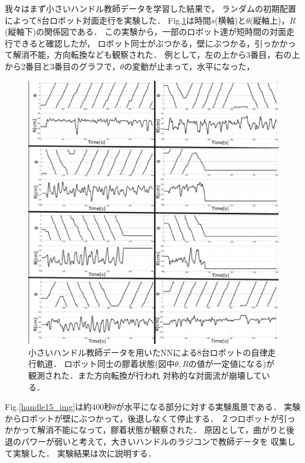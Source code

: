 我々はまず小さいハンドル教師データを学習した結果で，
ランダムの初期配置によって8台ロボット対面走行を実験した．
Fig.\ref{handle15_dia}は時間$s$(横軸)と$\theta$(縦軸上)，$R$(縦軸下)の関係図である．
この実験から，一部のロボット達が短時間の対面走行できると確認したが，
ロボット同士がぶつかる，壁にぶつかる，引っかかって解消不能，方向転換なども観察された．
例として，左の上から3番目，右の上から2番目と3番目のグラフで，$\theta$の変動が止まって，水平になった，

\vspace{-1mm}
\begin{figure}[!ht]
    \centering
    \includegraphics[width=1.0\linewidth]{NN_handle15.eps}
    \caption{小さいハンドル教師データを用いたNNによる8台ロボットの自律走行軌道．
    ロボット同士の膠着状態(図中$\theta,R$の値が一定値になる)が観測された．また方向転換が行われ
    対称的な対面流が崩壊している．}
    \label{handle15_dia}
\end{figure}

Fig.\ref{handle15_img}は約400秒$\theta$が水平になる部分に対する実験風景である．
実験からロボットが壁にぶつかって，後退しなくて停止する．
２つロボットが引っかかって解消不能になって，膠着状態が観察された．
原因として，曲がりと後退のパワーが弱いと考えて，大きいハンドルのラジコンで教師データを
収集して実験した．
実験結果は次に説明する．

